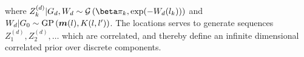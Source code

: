 where $Z_k^{(d)} | G_d, W_d \sim \gam{\beta \pi_k}{\exp(-W_d(l_k))}$ and $W_d | G_0 \sim \text{GP}\left(\bm m(l), K(l, l')\right)$. The locations serves to generate sequences $Z_1^{(d)}, Z_2^{(d)},\ldots$ which are correlated, and thereby define an infinite dimensional correlated prior over discrete components.





